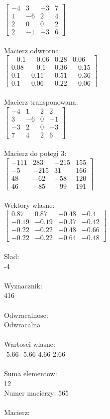 \documentclass[a4paper,12pt]{article}
\begin{document}
$\begin{bmatrix} -4&3&-3&7\\1&-6&2&4\\2&0&0&2\\2&-1&-3&6 \end{bmatrix}$
\\
\\
Macierz odwrotna:\\

$\begin{bmatrix} -0.1&-0.06&0.28&0.06\\0.08&-0.1&0.36&-0.15\\0.1&0.11&0.51&-0.36\\0.1&0.06&0.22&-0.06 \end{bmatrix}$
\\
\\
Macierz transponowana:\\

$\begin{bmatrix} -4&1&2&2\\3&-6&0&-1\\-3&2&0&-3\\7&4&2&6 \end{bmatrix}$
\\
\\
Macierz do potegi 3:\\

$\begin{bmatrix} -111&283&-215&155\\-5&-215&31&166\\48&-62&-58&120\\46&-85&-99&191 \end{bmatrix}$
\\
\\
Wektory wlasne:\\

$\begin{bmatrix} 0.87&0.87&-0.48&-0.4\\-0.19&-0.19&-0.37&-0.42\\-0.22&-0.22&-0.48&-0.66\\-0.22&-0.22&-0.64&-0.48 \end{bmatrix}$
\\
\\
Slad:\\
-4
\\
\\
Wyznacznik:\\
416
\\
\\
Odwracalnosc:\\
Odwracalna
\\
\\
Wartosci wlasne:\\
-5.66 -5.66 4.66 2.66
\\
\\
Suma elementow:\\
12
\\
\newpage
Numer macierzy:
565
\\
\\
Macierz:\\
\end{document}

